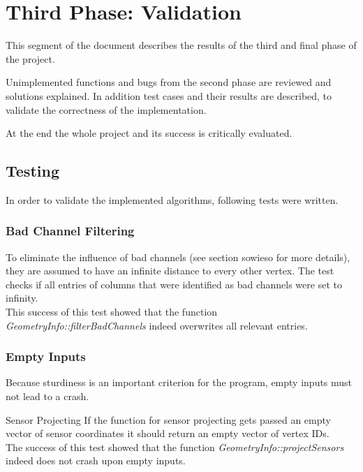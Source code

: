 \section{Third Phase: Validation}
This segment of the document describes the results of the third and final phase of the project.

Unimplemented functions and bugs from the second phase are reviewed and solutions explained. 
In addition test cases and their results are described, to validate the correctness of the implementation.

At the end the whole project and its success is critically evaluated.

\subsection{Testing}

In order to validate the implemented algorithms, following tests were written.

\subsubsection{Bad Channel Filtering}

To eliminate the influence of bad channels (see section sowieso for more details), they are assumed to have an infinite distance to every other vertex. The test checks if all entries of columns that were identified as bad channels were set to infinity.\\
This success of this test showed that the function \textit{GeometryInfo::filterBadChannels} indeed overwrites all relevant entries.

\subsubsection{Empty Inputs}

Because sturdiness is an important criterion for the program, empty inputs must not lead to a crash.

\begin{aims}
	\item[\hspace*{11mm} Sensor Projecting] If the function for sensor projecting gets passed an empty vector of sensor coordinates it should return an empty vector of vertex IDs. \\
	The success of this test showed that the function \textit{GeometryInfo::projectSensors} indeed does not crash upon empty inputs.
\end{aims}

